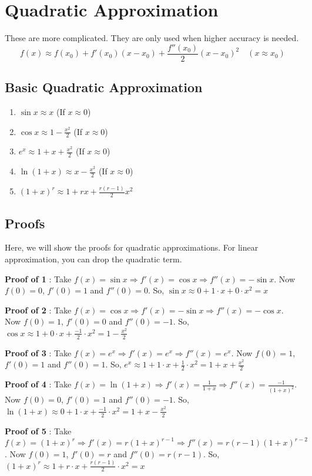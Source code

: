 \section{Quadratic Approximation}

These are more complicated. They are only used when higher accuracy is needed.
$$ \boxed{
	f(x) \approx f(x_0) + f'(x_0)(x-x_0) + \frac{f''(x_0)}{2}(x-x_0)^2 \quad (x \approx x_0)
}$$

\subsection{Basic Quadratic Approximation}

\begin{enumerate}
	\item $\sin x	\approx x$ (If $x \approx 0$)
	\item $\cos x	\approx 1 - \frac{x^2}{2}$ (If $x \approx 0$)
	\item $e ^ x	\approx 1 + x + \frac{x^2}{2}$ (If $x \approx 0$)
	\item $\ln(1+x)	\approx x - \frac{x^2}{2}$ (If $x \approx 0$)
	\item $(1+x)^r	\approx 1 + rx + \frac{r(r-1)}{2} x^2$
\end{enumerate}


\subsection*{Proofs}

Here, we will show the proofs for quadratic approximations. 
For linear approximation, you can drop the quadratic term.

\textbf{Proof of 1} : Take $ f(x) = \sin x \Rightarrow f'(x) = \cos x \Rightarrow f''(x) = - \sin x $. 
Now $f(0) = 0$, $f'(0) = 1$ and $f''(0) = 0$. 
So, $ \sin x \approx 0 + 1 \cdot x + 0 \cdot x^2 = x $

\textbf{Proof of 2} : Take $ f(x) = \cos x \Rightarrow f'(x) = -\sin x \Rightarrow f''(x) = - \cos x $. 
Now $f(0) = 1$, $f'(0) = 0$ and $f''(0) = -1$. 
So, $ \cos x \approx 1 + 0 \cdot x + \frac{-1}{2} \cdot x^2 = 1 - \frac{x^2}{2} $

\textbf{Proof of 3} : Take $ f(x) = e^x \Rightarrow f'(x) = e^x \Rightarrow f''(x) = e^x $. 
Now $f(0) = 1$, $f'(0) = 1$ and $f''(0) = 1$. 
So, $ e^x \approx 1 + 1 \cdot x + \frac{1}{2} \cdot x^2 = 1 + x + \frac{x^2}{2} $

\textbf{Proof of 4} : Take $ f(x) = \ln(1+x) \Rightarrow f'(x) = \frac{1}{1+x} \Rightarrow f''(x) = \frac{-1}{(1+x)^2} $. 
Now $f(0) = 0$, $f'(0) = 1$ and $f''(0) = -1$. 
So, $ \ln(1+x) \approx 0 + 1 \cdot x + \frac{-1}{2} \cdot x^2 = 1 + x - \frac{x^2}{2} $

\textbf{Proof of 5} : Take $ f(x) = (1+x)^r \Rightarrow f'(x) = r(1+x)^{r-1} \Rightarrow f''(x) = r(r-1)(1+x)^{r-2} $. 
Now $f(0) = 1$, $f'(0) = r$ and $f''(0) = r(r-1)$. 
So, $ (1+x)^r \approx 1 + r \cdot x + \frac{r(r-1)}{2} \cdot x^2 = x $


